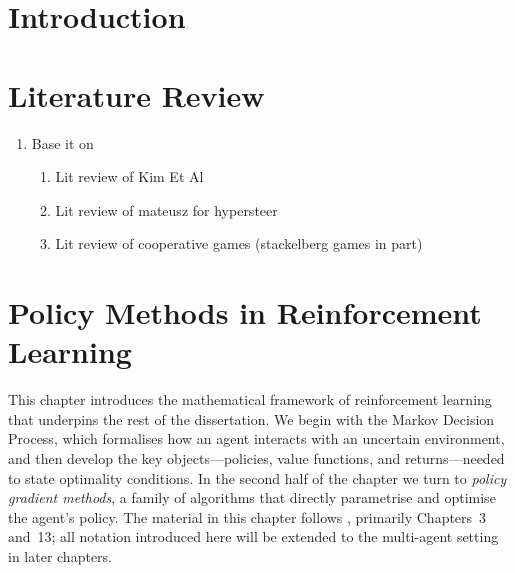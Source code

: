 \documentclass[a4paper,oneside,11pt]{report}
\begin{document}

\dissertationtitlepage


\begin{dissertationsummary}

\end{dissertationsummary}


\dissertationtableofcontents


\chapter{Introduction}

\chapter{Literature Review}

\begin{enumerate}
    \item Base it on 
        \begin{enumerate}
            \item Lit review of Kim Et Al
            \item Lit review of mateusz for hypersteer
            \item Lit review of cooperative games (stackelberg games in part)
        \end{enumerate}
\end{enumerate}

\chapter{Policy Methods in Reinforcement Learning}
\label{ch:policy-methods}

This chapter introduces the mathematical framework of reinforcement learning that underpins the rest of the dissertation. We begin with the Markov Decision Process, which formalises how an agent interacts with an uncertain environment, and then develop the key objects---policies, value functions, and returns---needed to state optimality conditions. In the second half of the chapter we turn to \emph{policy gradient methods}, a family of algorithms that directly parametrise and optimise the agent's policy. The material in this chapter follows \cite{sutton2018rl}, primarily Chapters~3 and~13; all notation introduced here will be extended to the multi-agent setting in later chapters.
\end{document}
